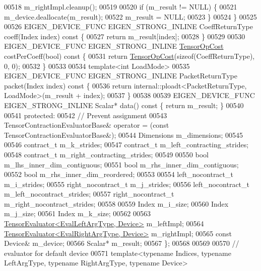 \begin{DoxyCode}
00518     m\_rightImpl.cleanup();
00519 
00520     \textcolor{keywordflow}{if} (m\_result != NULL) \{
00521       m\_device.deallocate(m\_result);
00522       m\_result = NULL;
00523     \}
00524   \}
00525 
00526   EIGEN\_DEVICE\_FUNC EIGEN\_STRONG\_INLINE CoeffReturnType coeff(Index index)\textcolor{keyword}{ const }\{
00527     \textcolor{keywordflow}{return} m\_result[index];
00528   \}
00529 
00530   EIGEN\_DEVICE\_FUNC EIGEN\_STRONG\_INLINE \hyperlink{class_eigen_1_1_tensor_op_cost}{TensorOpCost} costPerCoeff(\textcolor{keywordtype}{bool})\textcolor{keyword}{ const }\{
00531     \textcolor{keywordflow}{return} \hyperlink{class_eigen_1_1_tensor_op_cost}{TensorOpCost}(\textcolor{keyword}{sizeof}(CoeffReturnType), 0, 0);
00532   \}
00533 
00534   \textcolor{keyword}{template}<\textcolor{keywordtype}{int} LoadMode>
00535   EIGEN\_DEVICE\_FUNC EIGEN\_STRONG\_INLINE PacketReturnType packet(Index index)\textcolor{keyword}{ const }\{
00536     \textcolor{keywordflow}{return} internal::ploadt<PacketReturnType, LoadMode>(m\_result + index);
00537   \}
00538 
00539   EIGEN\_DEVICE\_FUNC EIGEN\_STRONG\_INLINE Scalar* data()\textcolor{keyword}{ const }\{ \textcolor{keywordflow}{return} m\_result; \}
00540 
00541   \textcolor{keyword}{protected}:
00542   \textcolor{comment}{// Prevent assignment}
00543   TensorContractionEvaluatorBase& operator = (\textcolor{keyword}{const} TensorContractionEvaluatorBase&);
00544   Dimensions m\_dimensions;
00545 
00546   contract\_t m\_k\_strides;
00547   contract\_t m\_left\_contracting\_strides;
00548   contract\_t m\_right\_contracting\_strides;
00549 
00550   \textcolor{keywordtype}{bool} m\_lhs\_inner\_dim\_contiguous;
00551   \textcolor{keywordtype}{bool} m\_rhs\_inner\_dim\_contiguous;
00552   \textcolor{keywordtype}{bool} m\_rhs\_inner\_dim\_reordered;
00553 
00554   left\_nocontract\_t m\_i\_strides;
00555   right\_nocontract\_t m\_j\_strides;
00556   left\_nocontract\_t m\_left\_nocontract\_strides;
00557   right\_nocontract\_t m\_right\_nocontract\_strides;
00558 
00559   Index m\_i\_size;
00560   Index m\_j\_size;
00561   Index m\_k\_size;
00562 
00563   \hyperlink{struct_eigen_1_1_tensor_evaluator}{TensorEvaluator<EvalLeftArgType, Device>} m\_leftImpl;
00564   \hyperlink{struct_eigen_1_1_tensor_evaluator}{TensorEvaluator<EvalRightArgType, Device>} m\_rightImpl;
00565   \textcolor{keyword}{const} Device& m\_device;
00566   Scalar* m\_result;
00567 \};
00568 
00569 
00570 \textcolor{comment}{// evaluator for default device}
00571 \textcolor{keyword}{template}<\textcolor{keyword}{typename} Indices, \textcolor{keyword}{typename} LeftArgType, \textcolor{keyword}{typename} RightArgType, \textcolor{keyword}{typename} Device>

\end{DoxyCode}
